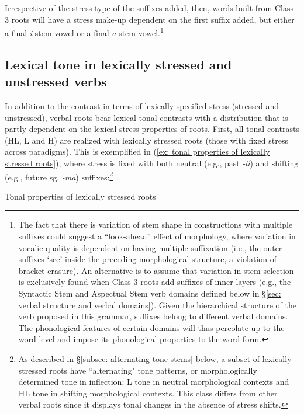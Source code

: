 Irrespective of the stress type of the suffixes added, then, words built from Class 3 roots will have a stress make-up dependent on the first suffix added, but either a final \textit{i} stem vowel or a final \textit{a} stem vowel.\footnote{The fact that there is variation of stem shape in constructions with multiple suffixes could suggest a ``look-ahead'' effect of morphology, where variation in vocalic quality is dependent on having multiple suffixation (i.e., the outer suffixes `see' inside the preceding morphological structure, a violation of bracket erasure). An alternative is to assume that variation in stem selection is exclusively found when Class 3 roots add suffixes of inner layers (e.g., the Syntactic Stem and Aspectual Stem verb domains defined below in §\ref{sec: verbal structure and verbal domains}). Given the hierarchical structure of the verb proposed in this grammar, suffixes belong to different verbal domains. The phonological features of certain domains will thus percolate up to the word level and impose its phonological properties to the word form.}

\subsection{Lexical tone in lexically stressed and unstressed verbs}
\label{subsec: tone in verbal classes}

In addition to the contrast in terms of lexically specified stress (stressed and unstressed), verbal roots bear lexical tonal contrasts with a distribution that is partly dependent on the lexical stress properties of roots. First, all tonal contrasts (HL, L and H) are realized with lexically stressed roots (those with fixed stress across paradigms). This is exemplified in (\ref{ex: tonal properties of lexically stressed roots}), where stress is fixed with both neutral (e.g., past \textit{-li}) and shifting (e.g., future sg. \textit{-ma}) suffixes:\footnote{As described in §\ref{subsec: alternating tone stems} below, a subset of lexically stressed roots have ``alternating" tone patterns, or morphologically determined tone in inflection: L tone in neutral morphological contexts and HL tone in shifting morphological contexts. This class differs from other verbal roots since it displays tonal changes in the absence of stress shifts.}

\ea\label{ex: tonal properties of lexically stressed roots}
{Tonal properties of lexically stressed roots}


